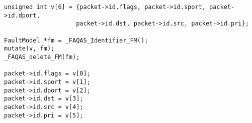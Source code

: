 
\begin{minipage}{16cm}
\begin{lstlisting}[style=CStyle, caption=Data-driven mutation example on libgscsp (csp\_io.c excerpt)., label=csp_integration]
unsigned int v[6] = {packet->id.flags, packet->id.sport, packet->id.dport, 
                    packet->id.dst, packet->id.src, packet->id.pri};

FaultModel *fm = _FAQAS_Identifier_FM();                                                                                          
mutate(v, fm);
_FAQAS_delete_FM(fm);

packet->id.flags = v[0];
packet->id.sport = v[1];
packet->id.dport = v[2]; 
packet->id.dst = v[3]; 
packet->id.src = v[4]; 
packet->id.pri = v[5]; 
\end{lstlisting}
\end{minipage}